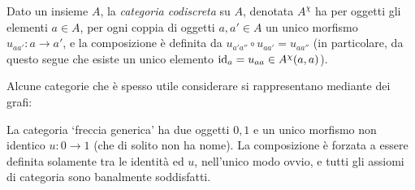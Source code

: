 \begin{example}\label{ex_cat_codiscreta}
	Dato un insieme \(A\), la \emph{categoria codiscreta} su \(A\), denotata \(A^\chi\) ha per oggetti gli elementi \(a\in A\), per ogni coppia di oggetti \(a,a'\in A\) un unico morfismo \(u_{aa'}:a\to a'\), e la composizione è definita da \(u_{a'a''}\circ u_{aa'}=u_{aa''}\) (in particolare, da questo segue che esiste un unico elemento \(\mathrm{id}_a=u_{aa}\in A^\chi(a,a)\)).
\end{example}
Alcune categorie che è spesso utile considerare si rappresentano mediante dei grafi:
\begin{example}\label{ex_cat_freccia}
	La categoria `freccia generica' ha due oggetti \(0,1\) e un unico morfismo non identico \(u : 0\to 1\) (che di solito non ha nome). La composizione è forzata a essere definita solamente tra le identità ed \(u\), nell'unico modo ovvio, e tutti gli assiomi di categoria sono banalmente soddisfatti.
\end{example}
